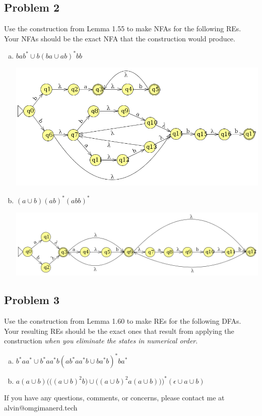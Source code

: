 \documentclass{math}
\begin{document}
\subsection*{Problem 2}
Use the construction from Lemma 1.55 to make NFAs for the following REs. Your
NFAs should be the exact NFA that the construction would produce.
\begin{enumerate}[(a)]
  \item \( bab^*\cup b(ba\cup ab)^*bb \)
  \begin{center}
    \includegraphics[width=16cm]{assets/hw_07_2a.png}
  \end{center}
  \item \( (a\cup b)(ab)^*(abb)^* \)
  \begin{center}
    \includegraphics[width=16cm]{assets/hw_07_2b.png}
  \end{center}
\end{enumerate}

\subsection*{Problem 3}
Use the construction from Lemma 1.60 to make REs for the following DFAs. Your
resulting REs should be the exact ones that result from applying the
construction \textit{when you eliminate the states in numerical order}.
\begin{enumerate}[(a)]
  \item \( b^*aa^*\cup b^*aa^*b(ab^*aa^*b\cup ba^*b)^*ba^* \)
  \item \( a(a\cup b)\Bigg(\big((a\cup b)^2b\big)\cup\big((a\cup b)^2a(a\cup b)\big)\Bigg)^*
    (\epsilon\cup a\cup b) \)
\end{enumerate}

\begin{center}
  If you have any questions, comments, or concerns, please contact me at
  alvin@omgimanerd.tech
\end{center}
\end{document}
